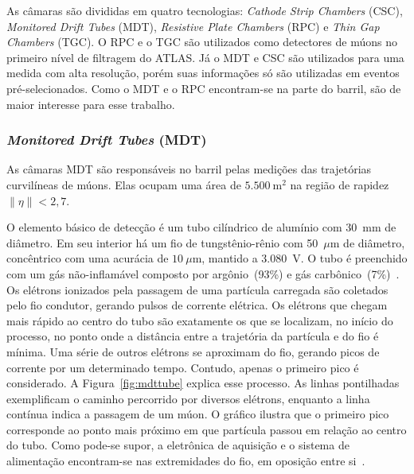 As câmaras são divididas em quatro tecnologias: \emph{Cathode Strip Chambers}
(CSC), \emph{Monitored Drift Tubes} (MDT), \emph{Resistive Plate Chambers}
(RPC) e \emph{Thin Gap Chambers} (TGC). O RPC e o TGC são utilizados como
detectores de múons no primeiro nível de filtragem do ATLAS. Já o MDT e CSC são
utilizados para uma medida com alta resolução, porém suas informações só são
utilizadas em eventos pré-selecionados. Como o MDT e o RPC encontram-se na
parte do barril, são de maior interesse para esse trabalho.


\subsubsection*{\emph{Monitored Drift Tubes} (MDT)}

As câmaras  MDT são responsáveis no barril pelas medições das trajetórias
curvilíneas de múons. Elas ocupam uma área de $5.500~\text{m}^2$ na região de
rapidez $\|\eta\|<2,7$.

O elemento básico de detecção é um tubo cilíndrico de alumínio com 30~mm de
diâmetro. Em seu interior há um fio de tungstênio-rênio com 50~$\mu$m de
diâmetro, concêntrico com uma acurácia de $10~\mu$m, mantido a 3.080~V. O tubo é
preenchido com um gás não-inflamável composto por argônio~(93\%) e gás
carbônico~(7\%)~\cite{RIEGLER2000}. Os elétrons ionizados pela passagem de uma
partícula carregada são coletados pelo fio condutor, gerando pulsos de corrente
elétrica. Os elétrons que chegam mais rápido ao centro do tubo são exatamente os
que se localizam, no início do processo, no ponto onde a distância entre a
trajetória da partícula e do fio é mínima. Uma série de outros elétrons se
aproximam do fio, gerando picos de corrente por um determinado tempo. Contudo,
apenas o primeiro pico é considerado. A Figura~\ref{fig:mdttube} explica esse
processo. As linhas pontilhadas exemplificam o caminho percorrido por diversos
elétrons, enquanto a linha contínua indica a passagem de um múon.  O gráfico
ilustra que o primeiro pico corresponde ao ponto mais próximo em que partícula
passou em relação ao centro do tubo. Como pode-se supor, a eletrônica de
aquisição e o sistema de alimentação encontram-se nas extremidades do fio, em
oposição entre si~\cite{ATLAS2008}.


